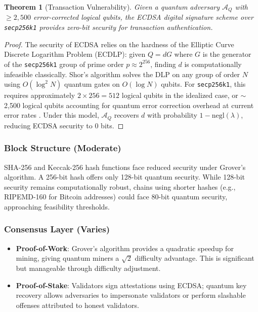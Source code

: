 \documentclass[12pt, a4paper, twocolumn]{article}
\newtheorem{theorem}{Theorem}
\begin{document}
\begin{theorem}[Transaction Vulnerability]
\label{thm:txvuln}
Given a quantum adversary $\mathcal{A}_Q$ with $\geq 2{,}500$ error-corrected logical qubits, the ECDSA digital signature scheme over \texttt{secp256k1} provides zero-bit security for transaction authentication.
\end{theorem}

\begin{proof}
The security of ECDSA relies on the hardness of the Elliptic Curve Discrete Logarithm Problem (ECDLP): given $Q = dG$ where $G$ is the generator of the \texttt{secp256k1} group of prime order $p \approx 2^{256}$, finding $d$ is computationally infeasible classically. Shor's algorithm solves the DLP on any group of order $N$ using $O(\log^2 N)$ quantum gates on $O(\log N)$ qubits. For \texttt{secp256k1}, this requires approximately $2 \times 256 = 512$ logical qubits in the idealized case, or $\sim$2,500 logical qubits accounting for quantum error correction overhead at current error rates \cite{roetteler2017quantum}. Under this model, $\mathcal{A}_Q$ recovers $d$ with probability $1 - \text{negl}(\lambda)$, reducing ECDSA security to $0$ bits.
\end{proof}

\subsubsection{Block Structure (Moderate)}
SHA-256 and Keccak-256 hash functions face reduced security under Grover's algorithm. A 256-bit hash offers only 128-bit quantum security. While 128-bit security remains computationally robust, chains using shorter hashes (e.g., RIPEMD-160 for Bitcoin addresses) could face 80-bit quantum security, approaching feasibility thresholds.

\subsubsection{Consensus Layer (Varies)}
\begin{itemize}[noitemsep]
  \item \textbf{Proof-of-Work}: Grover's algorithm provides a quadratic speedup for mining, giving quantum miners a $\sqrt{2}$ difficulty advantage. This is significant but manageable through difficulty adjustment.
  \item \textbf{Proof-of-Stake}: Validators sign attestations using ECDSA; quantum key recovery allows adversaries to impersonate validators or perform slashable offenses attributed to honest validators.
\end{itemize}
\end{document}
